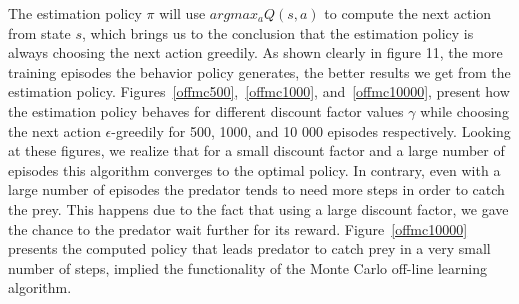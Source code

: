 \documentclass[a4paper,11pt]{article}
\begin{document}
The estimation policy $\pi$ will use $argmax_a Q(s,a)$ to compute the next action from state $s$, which brings us to the conclusion that the estimation policy is always choosing the next action greedily. As shown clearly in figure 11, the more training episodes the behavior policy generates, the better results we get from the estimation policy. Figures~\ref{offmc500},~\ref{offmc1000}, and~\ref{offmc10000}, present how the estimation policy behaves for different discount factor values $\gamma$ while choosing the next action $\epsilon$-greedily for 500, 1000, and 10 000 episodes respectively. Looking at these figures, we realize that for a small discount factor and a large number of episodes this algorithm converges to the optimal policy. In contrary, even with a large number of episodes the predator tends to need more steps in order to catch the prey. This happens due to the fact that using a large discount factor, we gave the chance to the predator wait further for its reward. Figure~\ref{offmc10000} presents the computed policy that leads predator to catch prey in a very small number of steps, implied the functionality of the Monte Carlo off-line learning algorithm. 
\end{document}
